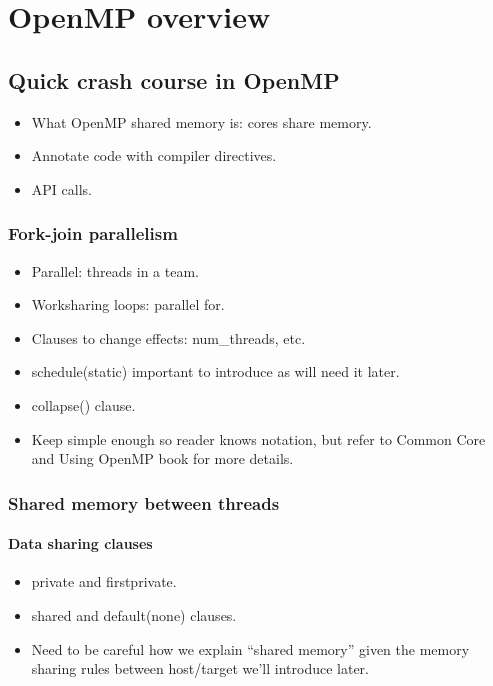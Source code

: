 
\chapter{OpenMP overview}
\label{chapter:overview}

\section{Quick crash course in OpenMP}
\begin{itemize}
  \item What OpenMP shared memory is: cores share memory.
  \item Annotate code with compiler directives.
  \item API calls.
\end{itemize}

\subsection{Fork-join parallelism}
\begin{itemize}
  \item Parallel: threads in a team.
  \item Worksharing loops: parallel for.
  \item Clauses to change effects: num\_threads, etc.
  \item schedule(static) important to introduce as will need it later.
  \item collapse() clause.
  \item Keep simple enough so reader knows notation, but refer to Common Core and Using OpenMP book for more details.
\end{itemize}

\subsection{Shared memory between threads}
\subsubsection{Data sharing clauses}
\begin{itemize}
  \item private and firstprivate.
  \item shared and default(none) clauses.
  \item Need to be careful how we explain “shared memory” given the memory sharing rules between host/target we’ll introduce later.
\end{itemize}

